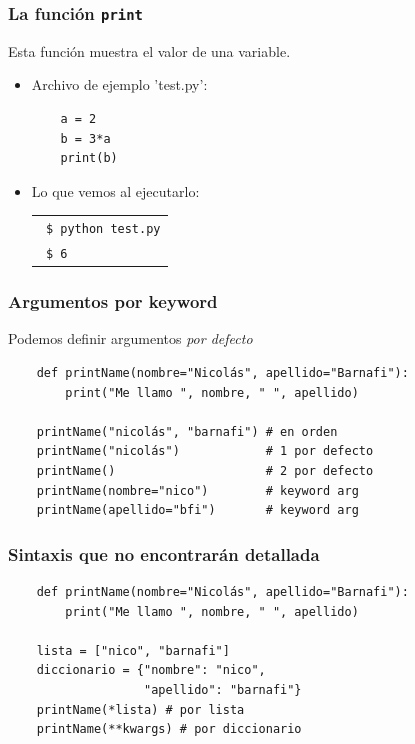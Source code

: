 \documentclass[14pt,aspectratio=169,xcolor=dvipsnames]{beamer}
\begin{document}
\begin{frame}[fragile]\frametitle{La función \texttt{print}}
Esta función muestra el valor de una variable. 
\begin{itemize}
    \item Archivo de ejemplo 'test.py':
    \begin{verbatim}
    a = 2
    b = 3*a
    print(b)
    \end{verbatim}
    \item Lo que vemos al ejecutarlo: 

        \begin{tabular}{l}
            \texttt{ \$ python test.py} \\
            \texttt{ \$ 6}
        \end{tabular}
\end{itemize}

\end{frame}
\begin{frame}[fragile]\frametitle{Argumentos por keyword}
    Podemos definir argumentos \emph{por defecto}
    \begin{verbatim}
    def printName(nombre="Nicolás", apellido="Barnafi"):
        print("Me llamo ", nombre, " ", apellido)

    printName("nicolás", "barnafi") # en orden
    printName("nicolás")            # 1 por defecto
    printName()                     # 2 por defecto
    printName(nombre="nico")        # keyword arg
    printName(apellido="bfi")       # keyword arg
    \end{verbatim}
\end{frame}
\begin{frame}[fragile]\frametitle{Sintaxis que no encontrarán detallada}
    \begin{verbatim}
    def printName(nombre="Nicolás", apellido="Barnafi"):
        print("Me llamo ", nombre, " ", apellido)

    lista = ["nico", "barnafi"]
    diccionario = {"nombre": "nico", 
                   "apellido": "barnafi"}
    printName(*lista) # por lista
    printName(**kwargs) # por diccionario
    \end{verbatim}

\end{frame}
\end{document}
